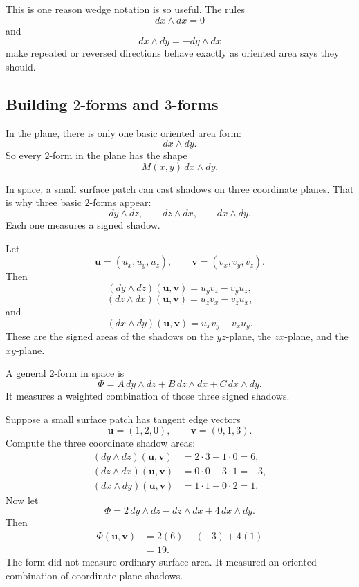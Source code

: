 This is one reason wedge notation is so useful.  The rules
\[
    dx\wedge dx=0
\]
and
\[
    dx\wedge dy=-dy\wedge dx
\]
make repeated or reversed directions behave exactly as oriented area says they should.

\subsection{Building \texorpdfstring{\(2\)}{2}-forms and
\texorpdfstring{\(3\)}{3}-forms}

In the plane, there is only one basic oriented area form:
\[
    dx\wedge dy.
\]
So every \(2\)-form in the plane has the shape
\[
    M(x,y)\,dx\wedge dy.
\]

In space, a small surface patch can cast shadows on three coordinate planes.  That is
why three basic \(2\)-forms appear:
\[
    dy\wedge dz,\qquad dz\wedge dx,\qquad dx\wedge dy.
\]
Each one measures a signed shadow.

Let
\[
    \mathbf u=(u_x,u_y,u_z),
    \qquad
    \mathbf v=(v_x,v_y,v_z).
\]
Then
\[
\boxed{
    (dy\wedge dz)(\mathbf u,\mathbf v)
    =
    u_yv_z-v_yu_z,
}
\]
\[
\boxed{
    (dz\wedge dx)(\mathbf u,\mathbf v)
    =
    u_zv_x-v_zu_x,
}
\]
and
\[
\boxed{
    (dx\wedge dy)(\mathbf u,\mathbf v)
    =
    u_xv_y-v_xu_y.
}
\]
These are the signed areas of the shadows on the \(yz\)-plane, the \(zx\)-plane, and
the \(xy\)-plane.

A general \(2\)-form in space is
\[
\boxed{
    \Phi=A\,dy\wedge dz+B\,dz\wedge dx+C\,dx\wedge dy.
}
\]
It measures a weighted combination of those three signed shadows.

\begin{example}
Suppose a small surface patch has tangent edge vectors
\[
    \mathbf u=(1,2,0),
    \qquad
    \mathbf v=(0,1,3).
\]
Compute the three coordinate shadow areas:
\[
\begin{aligned}
    (dy\wedge dz)(\mathbf u,\mathbf v)
    &=
    2\cdot3-1\cdot0
    =
    6,\\
    (dz\wedge dx)(\mathbf u,\mathbf v)
    &=
    0\cdot0-3\cdot1
    =
    -3,\\
    (dx\wedge dy)(\mathbf u,\mathbf v)
    &=
    1\cdot1-0\cdot2
    =
    1.
\end{aligned}
\]
Now let
\[
    \Phi=2\,dy\wedge dz-dz\wedge dx+4\,dx\wedge dy.
\]
Then
\[
\begin{aligned}
    \Phi(\mathbf u,\mathbf v)
    &=
    2(6)-(-3)+4(1)\\
    &=
    19.
\end{aligned}
\]
The form did not measure ordinary surface area.  It measured an oriented combination
of coordinate-plane shadows.
\end{example}

